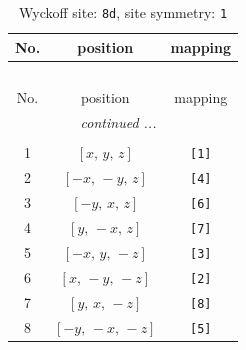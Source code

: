 \documentclass[fleqn,8pt]{jsarticle}
\begin{document}
\begin{longtable}{ccc}
\caption{Wyckoff site: {\tt 8d}, site symmetry: {\tt 1}}
 \\
 \hline \hline
No. & position & mapping \\ \hline \endfirsthead

\multicolumn{2}{l}{\tablename\ \thetable{}} \\
 \hline \hline
No. & position & mapping \\ \hline \endhead

 \hline \hline
\multicolumn{2}{r}{\footnotesize\it continued ...} \\ \endfoot

 \hline \hline
\multicolumn{2}{r}{} \\ \endlastfoot

1 & $\left[ x,\, y,\, z \right]$ & {\tt [1]} \\ \hline
2 & $\left[ - x,\, - y,\, z \right]$ & {\tt [4]} \\ \hline
3 & $\left[ - y,\, x,\, z \right]$ & {\tt [6]} \\ \hline
4 & $\left[ y,\, - x,\, z \right]$ & {\tt [7]} \\ \hline
5 & $\left[ - x,\, y,\, - z \right]$ & {\tt [3]} \\ \hline
6 & $\left[ x,\, - y,\, - z \right]$ & {\tt [2]} \\ \hline
7 & $\left[ y,\, x,\, - z \right]$ & {\tt [8]} \\ \hline
8 & $\left[ - y,\, - x,\, - z \right]$ & {\tt [5]} \\
\end{longtable}
\end{document}
